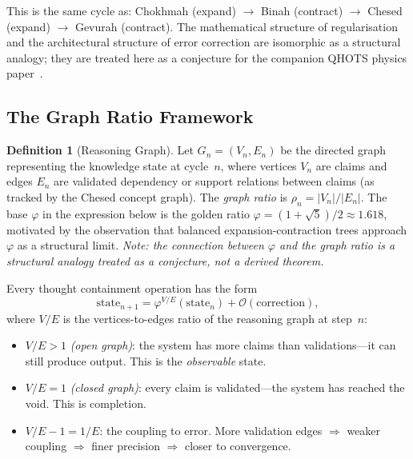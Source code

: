 \documentclass[11pt]{article}
\theoremstyle{definition}
\newtheorem{definition}[theorem]{Definition}
\theoremstyle{remark}
\begin{document}
This is the same cycle as: Chokhmah (expand) $\to$ Binah (contract) $\to$
Chesed (expand) $\to$ Gevurah (contract).  The mathematical structure of
regularisation and the architectural structure of error correction are
isomorphic as a structural analogy; they are treated here as a conjecture for
the companion QHOTS physics paper~\cite{qhots2026}.

\subsection{The Graph Ratio Framework}
\label{sec:graph-ratio}

\begin{definition}[Reasoning Graph]
\label{def:reasoning-graph}
Let $G_n = (V_n, E_n)$ be the directed graph representing the knowledge state
at cycle~$n$, where vertices $V_n$ are claims and edges $E_n$ are validated
dependency or support relations between claims (as tracked by the Chesed concept
graph).  The \emph{graph ratio} is $\rho_n = |V_n|/|E_n|$.  The base $\varphi$
in the expression below is the golden ratio $\varphi = (1+\sqrt{5})/2 \approx
1.618$, motivated by the observation that balanced expansion-contraction trees
approach $\varphi$ as a structural limit.  \emph{Note: the connection between
$\varphi$ and the graph ratio is a structural analogy treated as a conjecture,
not a derived theorem.}
\end{definition}

Every thought containment operation has the form
\begin{equation}
  \mathrm{state}_{n+1}
  = \varphi^{V/E}(\mathrm{state}_n) + \mathcal{O}(\mathrm{correction}),
  \label{eq:state-update}
\end{equation}
where $V/E$ is the vertices-to-edges ratio of the reasoning graph at step~$n$:
\begin{itemize}
  \item $V/E > 1$ \emph{(open graph)}: the system has more claims than
    validations---it can still produce output.  This is the \emph{observable}
    state.
  \item $V/E = 1$ \emph{(closed graph)}: every claim is validated---the system
    has reached the void.  This is completion.
  \item $V/E - 1 = 1/E$: the coupling to error.  More validation edges
    $\Rightarrow$ weaker coupling $\Rightarrow$ finer precision $\Rightarrow$
    closer to convergence.
\end{itemize}
\end{document}
